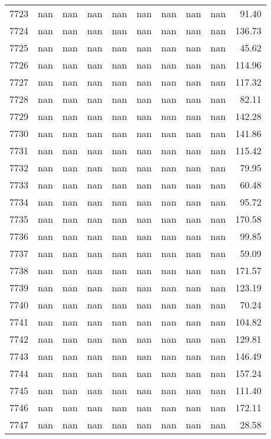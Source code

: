 \begin{tabular}{lrrrrrrrrr}
7723 & nan & nan & nan & nan & nan & nan & nan & nan & 91.40 \\
7724 & nan & nan & nan & nan & nan & nan & nan & nan & 136.73 \\
7725 & nan & nan & nan & nan & nan & nan & nan & nan & 45.62 \\
7726 & nan & nan & nan & nan & nan & nan & nan & nan & 114.96 \\
7727 & nan & nan & nan & nan & nan & nan & nan & nan & 117.32 \\
7728 & nan & nan & nan & nan & nan & nan & nan & nan & 82.11 \\
7729 & nan & nan & nan & nan & nan & nan & nan & nan & 142.28 \\
7730 & nan & nan & nan & nan & nan & nan & nan & nan & 141.86 \\
7731 & nan & nan & nan & nan & nan & nan & nan & nan & 115.42 \\
7732 & nan & nan & nan & nan & nan & nan & nan & nan & 79.95 \\
7733 & nan & nan & nan & nan & nan & nan & nan & nan & 60.48 \\
7734 & nan & nan & nan & nan & nan & nan & nan & nan & 95.72 \\
7735 & nan & nan & nan & nan & nan & nan & nan & nan & 170.58 \\
7736 & nan & nan & nan & nan & nan & nan & nan & nan & 99.85 \\
7737 & nan & nan & nan & nan & nan & nan & nan & nan & 59.09 \\
7738 & nan & nan & nan & nan & nan & nan & nan & nan & 171.57 \\
7739 & nan & nan & nan & nan & nan & nan & nan & nan & 123.19 \\
7740 & nan & nan & nan & nan & nan & nan & nan & nan & 70.24 \\
7741 & nan & nan & nan & nan & nan & nan & nan & nan & 104.82 \\
7742 & nan & nan & nan & nan & nan & nan & nan & nan & 129.81 \\
7743 & nan & nan & nan & nan & nan & nan & nan & nan & 146.49 \\
7744 & nan & nan & nan & nan & nan & nan & nan & nan & 157.24 \\
7745 & nan & nan & nan & nan & nan & nan & nan & nan & 111.40 \\
7746 & nan & nan & nan & nan & nan & nan & nan & nan & 172.11 \\
7747 & nan & nan & nan & nan & nan & nan & nan & nan & 28.58 \\

\end{tabular}
